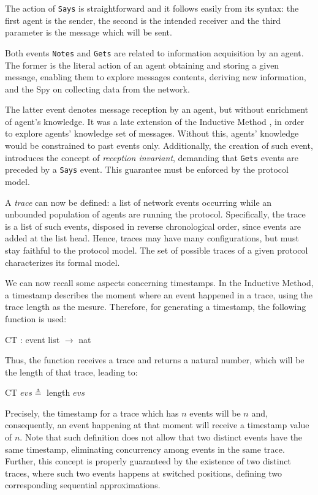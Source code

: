 The action of \texttt{Says} is straightforward and it follows easily from its syntax: the first agent is the sender, the second is the intended receiver and the third parameter is the message which will be sent.

Both events \texttt{Notes} and \texttt{Gets} are related to information acquisition by an agent. The former is the literal action of an agent obtaining and storing a given message, enabling them to explore messages contents, deriving new information, and the Spy on collecting data from the network.

The latter event denotes message reception by an agent, but without enrichment of agent's knowledge. It was a late extension of the Inductive Method \cite[Ch. 8]{bella-book}, in order to explore agents' knowledge set of messages. Without this, agents' knowledge would be constrained to past events only. Additionally, the creation of such event, introduces the concept of \textit{reception invariant}, demanding that \texttt{Gets} events are preceded by a \texttt{Says} event. This guarantee must be enforced by the protocol model.

A \textit{trace} can now be defined: a list of network events occurring while an unbounded population of agents are running the protocol. Specifically, the trace is a list of such events, disposed in reverse chronological order, since events are added at the list head. Hence, traces may have many configurations, but must stay faithful to the protocol model. The set of possible traces of a given protocol characterizes its formal model.

We can now recall some aspects concerning timestamps. In the Inductive Method, a timestamp describes the moment where an event happened in a trace, using the trace length as the mesure. Therefore, for generating a timestamp, the following function is used:

\begin{center}
  {\ttfamily CT : event list $\longrightarrow$ nat}
\end{center}

Thus, the function receives a trace and returns a natural number, which will be the length of that trace, leading to:

\begin{center}
  {\ttfamily CT $evs \triangleq$ length $evs$}
\end{center}

Precisely, the timestamp for a trace which has $n$ events will be $n$ and, consequently, an event happening at that moment will receive a timestamp value of $n$. Note that such definition does not allow that two distinct events have the same timestamp, eliminating concurrency among events in the same trace. Further, this concept is properly guaranteed by the existence of two distinct traces, where such two events happens at switched positions, defining two corresponding sequential approximations.


